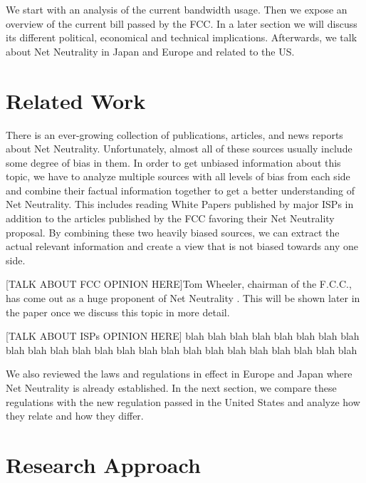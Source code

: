 \documentclass{sigcomm-alternate}
\begin{document}
We start with an analysis of the current bandwidth usage. Then we expose an overview of the current bill passed by the FCC. In a later section we will discuss its different political, economical and technical implications. Afterwards, we talk about Net Neutrality in Japan and Europe and related to the US.


\section{Related Work}
There is an ever-growing collection of publications, articles, and news reports about Net Neutrality. Unfortunately, almost all of these sources usually include some degree of bias in them. In order to get unbiased information about this topic, we have to analyze multiple sources with all levels of bias from each side and combine their factual information together to get a better understanding of Net Neutrality. This includes reading White Papers published by major ISPs in addition to the articles published by the FCC favoring their Net Neutrality proposal. By combining these two heavily biased sources, we can extract the actual relevant information and create a view that is not biased towards any one side. 

[TALK ABOUT FCC OPINION HERE]Tom Wheeler, chairman of the F.C.C., has come out as a huge proponent of Net Neutrality \cite{FCCTomWheeler}. This will be shown later in the paper once we discuss this topic in more detail.


[TALK ABOUT ISPs OPINION HERE]
blah blah blah blah blah blah blah blah blah blah blah blah blah blah blah blah blah blah blah blah blah blah blah blah

We also reviewed the laws and regulations in effect in Europe and Japan where Net Neutrality is already established. In the next section, we compare these regulations with the new regulation passed in the United States and analyze how they relate and how they differ.

\section{Research Approach}
\end{document}
